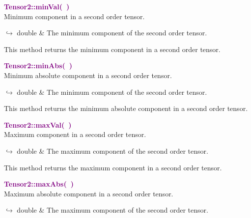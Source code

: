 \textcolor{purple}{\textbf{Tensor2::minVal(~)}}\label{Tensor2::minVal()}\\
Minimum component in a second order tensor.\vspace*{-0.5em}
\begin{tcolorbox}[grow to left by=-1cm, width=\textwidth-1cm,myArgs,tabularx={l|R}]
$\hookrightarrow$ double & The minimum component of the second order tensor.
\end{tcolorbox}

This method returns the minimum component in a second order tensor.

\textcolor{purple}{\textbf{Tensor2::minAbs(~)}}\label{Tensor2::minAbs()}\\
Minimum absolute component in a second order tensor.\vspace*{-0.5em}
\begin{tcolorbox}[grow to left by=-1cm, width=\textwidth-1cm,myArgs,tabularx={l|R}]
$\hookrightarrow$ double & The minimum component of the second order tensor.
\end{tcolorbox}

This method returns the minimum absolute component in a second order tensor.

\textcolor{purple}{\textbf{Tensor2::maxVal(~)}}\label{Tensor2::maxVal()}\\
Maximum component in a second order tensor.\vspace*{-0.5em}
\begin{tcolorbox}[grow to left by=-1cm, width=\textwidth-1cm,myArgs,tabularx={l|R}]
$\hookrightarrow$ double & The maximum component of the second order tensor.
\end{tcolorbox}

This method returns the maximum component in a second order tensor.

\textcolor{purple}{\textbf{Tensor2::maxAbs(~)}}\label{Tensor2::maxAbs()}\\
Maximum absolute component in a second order tensor.\vspace*{-0.5em}
\begin{tcolorbox}[grow to left by=-1cm, width=\textwidth-1cm,myArgs,tabularx={l|R}]
$\hookrightarrow$ double & The maximum component of the second order tensor.
\end{tcolorbox}


